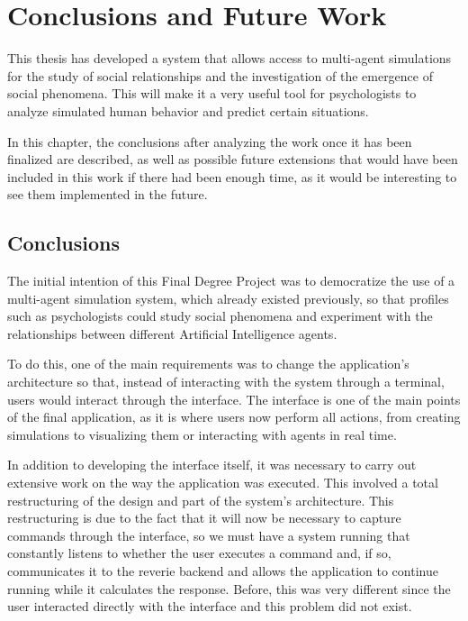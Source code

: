 \chapter*{Conclusions and Future Work}
\label{cap:conclusions}

This thesis has developed a system that allows access to multi-agent simulations for the study of social relationships and the investigation of the emergence of social phenomena. This will make it a very useful tool for psychologists to analyze simulated human behavior and predict certain situations.

In this chapter, the conclusions after analyzing the work once it has been finalized are described, as well as possible future extensions that would have been included in this work if there had been enough time, as it would be interesting to see them implemented in the future.

\section*{Conclusions}

The initial intention of this Final Degree Project was to democratize the use of a multi-agent simulation system, which already existed previously, so that profiles such as psychologists could study social phenomena and experiment with the relationships between different Artificial Intelligence agents.

To do this, one of the main requirements was to change the application's architecture so that, instead of interacting with the system through a terminal, users would interact through the interface. The interface is one of the main points of the final application, as it is where users now perform all actions, from creating simulations to visualizing them or interacting with agents in real time.

In addition to developing the interface itself, it was necessary to carry out extensive work on the way the application was executed. This involved a total restructuring of the design and part of the system's architecture. This restructuring is due to the fact that it will now be necessary to capture commands through the interface, so we must have a system running that constantly listens to whether the user executes a command and, if so, communicates it to the reverie backend and allows the application to continue running while it calculates the response. Before, this was very different since the user interacted directly with the interface and this problem did not exist.

